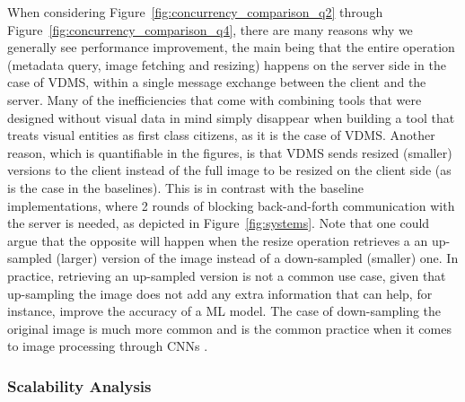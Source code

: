 When considering Figure~\ref{fig:concurrency_comparison_q2}
through Figure~\ref{fig:concurrency_comparison_q4},
there are many reasons why we generally see performance improvement, the main being
that the entire operation (metadata query, image fetching and resizing) happens
on the server side in the case of VDMS, within a single message
exchange between the client and the server.
Many of the inefficiencies that come with combining tools that were designed
without visual data in mind simply disappear when building a tool that treats
visual entities as first class citizens, as it is the case of VDMS.
Another reason, which is quantifiable in the figures, is that
VDMS sends resized (smaller) versions to the client instead of the full image
to be resized on the client side (as is the case in the baselines).
This is in contrast with the baseline implementations,
where 2 rounds of blocking back-and-forth communication with the server is needed,
as depicted in Figure~\ref{fig:systems}.
Note that one could argue that the opposite will happen
when the resize operation retrieves a an up-sampled (larger) version of the image
instead of a down-sampled (smaller) one.
In practice, retrieving an up-sampled version is not a common use case,
given that up-sampling the image does not add any extra information that can help,
for instance, improve the accuracy of a ML model.
The case of down-sampling the original image is much more common and is the common
practice when it comes to image processing through CNNs \cite{cnn,resnet}.




\subsubsection{Scalability Analysis}

